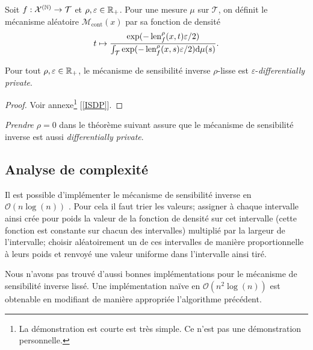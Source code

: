 \begin{definition}
    Soit \(f : \mathcal X^{(\mathbb{N})} \to \mathcal T\) et \(\rho, \varepsilon \in \mathbb{R}_+\). Pour une mesure \(\mu\) sur \(\mathcal T\), on définit le mécanisme aléatoire \(\mathcal M_{\text{cont}}(x)\) par sa fonction de densité 
    \[
        t \mapsto \dfrac{\exp(-\operatorname{len}_f^\rho(x, t)\varepsilon/2)}{\int_\mathcal T \exp(-\operatorname{len}_f^\rho(x, s)\varepsilon/2)\mathrm{d} \mu(s)}.   
    \] 
\end{definition}

\begin{theorem}
    Pour tout \(\rho,\varepsilon \in \mathbb{R}_+\), le mécanisme de sensibilité inverse \(\rho\)-lisse est \(\varepsilon\)-\textit{differentially private}.
\end{theorem}


\begin{proof}
    Voir annexe\footnote{La démonstration est courte est très simple. Ce n'est pas une démonstration personnelle.} [\ref{ISDP}].
\end{proof}


\begin{remark}
    \textit{Prendre \(\rho = 0\)} dans le théorème suivant assure que le mécanisme de sensibilité inverse est aussi \textit{differentially private}.
\end{remark}

\subsection{Analyse de complexité}

Il est possible d'implémenter le mécanisme de sensibilité inverse en \(\mathcal O(n\log(n))\) \cite{dwork2014the}. Pour cela il faut trier les valeurs; assigner à chaque intervalle ainsi crée pour poids la valeur de la fonction de densité sur cet intervalle (cette fonction est constante sur chacun des intervalles) multiplié par la largeur de l'intervalle; choisir aléatoirement un de ces intervalles de manière proportionnelle à leurs poids et renvoyé une valeur uniforme dans l'intervalle ainsi tiré.\\

\begin{remark}
    Nous n'avons pas trouvé d'aussi bonnes implémentations pour le mécanisme de sensibilité inverse lissé. Une implémentation naïve en \(\mathcal O(n^2\log(n))\) est obtenable en modifiant de manière appropriée l'algorithme précédent.
\end{remark}

